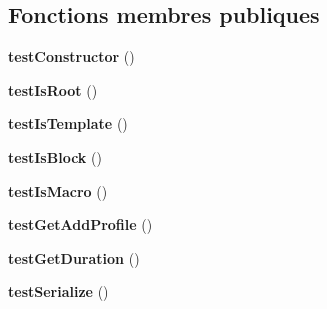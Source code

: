 \subsection*{Fonctions membres publiques}
\begin{DoxyCompactItemize}
\item 
{\bfseries test\+Constructor} ()\hypertarget{class_twig___tests___profiler___profile_test_a47094dc941e72950570900d1418f89c6}{}\label{class_twig___tests___profiler___profile_test_a47094dc941e72950570900d1418f89c6}

\item 
{\bfseries test\+Is\+Root} ()\hypertarget{class_twig___tests___profiler___profile_test_a5e9b4f161ea8e761c577a37422633096}{}\label{class_twig___tests___profiler___profile_test_a5e9b4f161ea8e761c577a37422633096}

\item 
{\bfseries test\+Is\+Template} ()\hypertarget{class_twig___tests___profiler___profile_test_af825e603d82c2ddaa728a106f1db2e89}{}\label{class_twig___tests___profiler___profile_test_af825e603d82c2ddaa728a106f1db2e89}

\item 
{\bfseries test\+Is\+Block} ()\hypertarget{class_twig___tests___profiler___profile_test_a17e9b162f0bb6fd8e1cb2b3af551f1f5}{}\label{class_twig___tests___profiler___profile_test_a17e9b162f0bb6fd8e1cb2b3af551f1f5}

\item 
{\bfseries test\+Is\+Macro} ()\hypertarget{class_twig___tests___profiler___profile_test_a928897942a68ec58792deaa8d6fc3c82}{}\label{class_twig___tests___profiler___profile_test_a928897942a68ec58792deaa8d6fc3c82}

\item 
{\bfseries test\+Get\+Add\+Profile} ()\hypertarget{class_twig___tests___profiler___profile_test_a5471ec2e96c5af01cc82b4d118cc2280}{}\label{class_twig___tests___profiler___profile_test_a5471ec2e96c5af01cc82b4d118cc2280}

\item 
{\bfseries test\+Get\+Duration} ()\hypertarget{class_twig___tests___profiler___profile_test_a706e67c79174f80ead5b8576bea57fcc}{}\label{class_twig___tests___profiler___profile_test_a706e67c79174f80ead5b8576bea57fcc}

\item 
{\bfseries test\+Serialize} ()\hypertarget{class_twig___tests___profiler___profile_test_a9a05a400df1e207698ca6fe07e0474b8}{}\label{class_twig___tests___profiler___profile_test_a9a05a400df1e207698ca6fe07e0474b8}

\end{DoxyCompactItemize}



